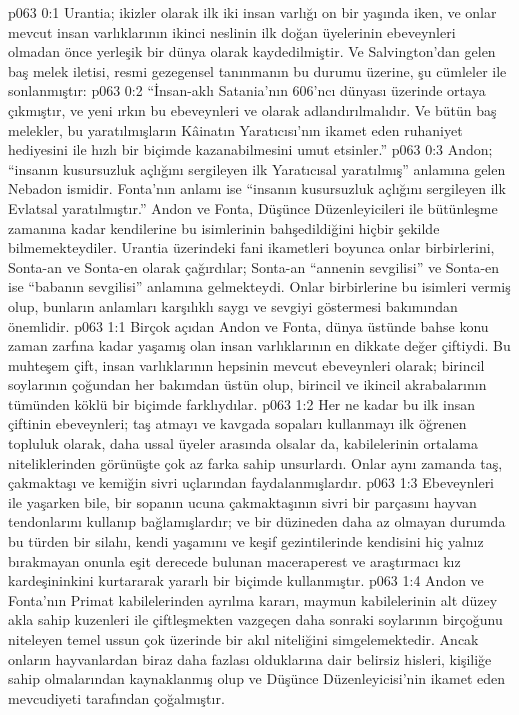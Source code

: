 \vs p063 0:1 Urantia; ikizler olarak ilk iki insan varlığı on bir yaşında iken, ve onlar mevcut insan varlıklarının ikinci neslinin ilk doğan üyelerinin ebeveynleri olmadan önce yerleşik bir dünya olarak kaydedilmiştir. Ve Salvington’dan gelen baş melek iletisi, resmi gezegensel tanınmanın bu durumu üzerine, şu cümleler ile sonlanmıştır:
\vs p063 0:2 “İnsan\hyp{}aklı Satania’nın 606’ncı dünyası üzerinde ortaya çıkmıştır, ve yeni ırkın bu ebeveynleri  ve  olarak adlandırılmalıdır. Ve bütün baş melekler, bu yaratılmışların Kâinatın Yaratıcısı’nın ikamet eden ruhaniyet hediyesini ile hızlı bir biçimde kazanabilmesini umut etsinler.”
\vs p063 0:3 Andon; “insanın kusursuzluk açlığını sergileyen ilk Yaratıcısal yaratılmış” anlamına gelen Nebadon ismidir. Fonta’nın anlamı ise “insanın kusursuzluk açlığını sergileyen ilk Evlatsal yaratılmıştır.” Andon ve Fonta, Düşünce Düzenleyicileri ile bütünleşme zamanına kadar kendilerine bu isimlerinin bahşedildiğini hiçbir şekilde bilmemekteydiler. Urantia üzerindeki fani ikametleri boyunca onlar birbirlerini, Sonta\hyp{}an ve Sonta\hyp{}en olarak çağırdılar; Sonta\hyp{}an “annenin sevgilisi” ve Sonta\hyp{}en ise “babanın sevgilisi” anlamına gelmekteydi. Onlar birbirlerine bu isimleri vermiş olup, bunların anlamları karşılıklı saygı ve sevgiyi göstermesi bakımından önemlidir.
\vs p063 1:1 Birçok açıdan Andon ve Fonta, dünya üstünde bahse konu zaman zarfına kadar yaşamış olan insan varlıklarının en dikkate değer çiftiydi. Bu muhteşem çift, insan varlıklarının hepsinin mevcut ebeveynleri olarak; birincil soylarının çoğundan her bakımdan üstün olup, birincil ve ikincil akrabalarının tümünden köklü bir biçimde farklıydılar.
\vs p063 1:2 Her ne kadar bu ilk insan çiftinin ebeveynleri; taş atmayı ve kavgada sopaları kullanmayı ilk öğrenen topluluk olarak, daha ussal üyeler arasında olsalar da, kabilelerinin ortalama niteliklerinden görünüşte çok az farka sahip unsurlardı. Onlar aynı zamanda taş, çakmaktaşı ve kemiğin sivri uçlarından faydalanmışlardır.
\vs p063 1:3 Ebeveynleri ile yaşarken bile, bir sopanın ucuna çakmaktaşının sivri bir parçasını hayvan tendonlarını kullanıp bağlamışlardır; ve bir düzineden daha az olmayan durumda bu türden bir silahı, kendi yaşamını ve keşif gezintilerinde kendisini hiç yalnız bırakmayan onunla eşit derecede bulunan maceraperest ve araştırmacı kız kardeşininkini kurtararak yararlı bir biçimde kullanmıştır.
\vs p063 1:4 Andon ve Fonta’nın Primat kabilelerinden ayrılma kararı, maymun kabilelerinin alt düzey akla sahip kuzenleri ile çiftleşmekten vazgeçen daha sonraki soylarının birçoğunu niteleyen temel ussun çok üzerinde bir akıl niteliğini simgelemektedir. Ancak onların hayvanlardan biraz daha fazlası olduklarına dair belirsiz hisleri, kişiliğe sahip olmalarından kaynaklanmış olup ve Düşünce Düzenleyicisi’nin ikamet eden mevcudiyeti tarafından çoğalmıştır.
